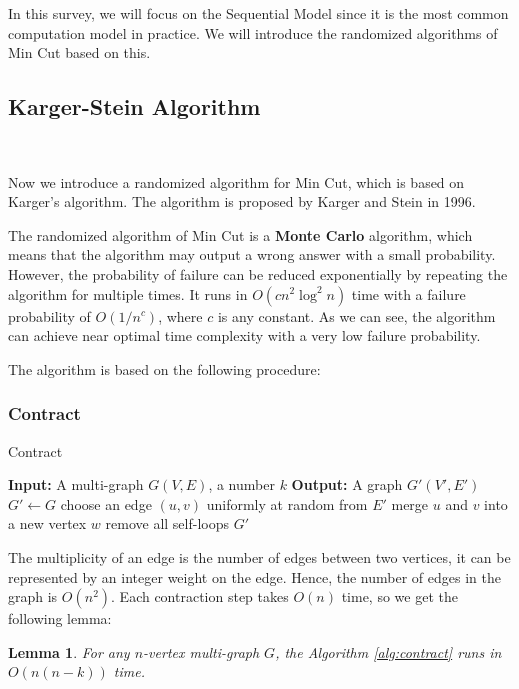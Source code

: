 \documentclass[11pt]{article}
\theoremstyle{plain}
\newtheorem{lemma}{Lemma}[section]
\begin{document}
In this survey, we will focus on the Sequential Model since it is the most common computation model in practice. We will introduce the randomized algorithms of Min Cut based on this.

\subsection{Karger-Stein Algorithm}\

Now we introduce a randomized algorithm for Min Cut, which is based on Karger's algorithm\cite{inproceedings}. The algorithm is proposed by Karger and Stein in 1996\cite{karger1996new}.

The randomized algorithm of Min Cut is a \textbf{Monte Carlo} algorithm, which means that the algorithm may output a wrong answer with a small probability. However, the probability of failure can be reduced exponentially by repeating the algorithm for multiple times. It runs in $O(cn^2\log^2 n)$ time with a failure probability of $O(1/n^c)$, where $c$ is any constant. As we can see, the algorithm can achieve near optimal time complexity with a very low failure probability.

The algorithm is based on the following procedure:
\subsubsection{Contract}
\begin{algorithm}
\caption{Contract}
\label{alg:contract}
\begin{algorithmic}[1]
    \STATE \textbf{Input:} A multi-graph $G(V,E)$, a number $k$
    \STATE \textbf{Output:} A graph $G'(V',E')$
    \STATE $G'\leftarrow G$
    \STATE choose an edge $(u,v)$ uniformly at random from $E'$
    \STATE merge $u$ and $v$ into a new vertex $w$
    \STATE remove all self-loops
    \ENDWHILE
    \RETURN $G'$
\end{algorithmic}
\end{algorithm}
The multiplicity of an edge is the number of edges between two vertices, it can be represented by an integer weight on the edge. Hence, the number of edges in the graph is $O(n^2)$. Each contraction step takes $O(n)$ time, so we get the following lemma:

\begin{lemma}
    \label{lemma:9}
    For any $n$-vertex multi-graph $G$, the Algorithm \ref{alg:contract} runs in $O(n(n-k))$ time.
\end{lemma}
\end{document}
